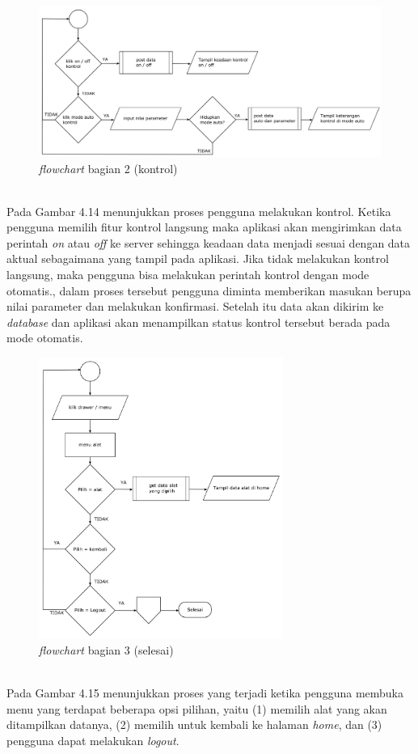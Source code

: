 \begin{flushleft}
\begin{justify}
\begin{enumerate}[label=\alph*.]
            \vspace{8cm}
            \begin{figure}[ht]
                \centering
                \includegraphics[width=12cm]{images/bab 4/fc-kontrol.png}
                \caption{\textit{flowchart} bagian 2 (kontrol)}
            \end{figure}
            \\Pada Gambar 4.14 menunjukkan proses pengguna melakukan kontrol. Ketika pengguna memilih fitur kontrol langsung maka aplikasi akan mengirimkan data perintah \emph{on} atau \emph{off}
            ke server sehingga keadaan data menjadi sesuai dengan data aktual sebagaimana yang tampil pada aplikasi. 
            Jika tidak melakukan kontrol langsung, maka pengguna bisa melakukan perintah kontrol dengan mode otomatis., dalam proses tersebut pengguna diminta memberikan masukan berupa nilai parameter dan melakukan konfirmasi. Setelah itu data akan dikirim ke \emph{database} dan aplikasi akan menampilkan status kontrol tersebut berada pada mode otomatis.
            \begin{figure}[ht]
                \centering
                \includegraphics[width=8cm]{images/bab 4/fc-pilih alat.png}
                \caption{\textit{flowchart} bagian 3 (selesai)}
            \end{figure}
            \\Pada Gambar 4.15 menunjukkan proses yang terjadi ketika pengguna membuka menu yang terdapat beberapa opsi pilihan, yaitu (1) memilih alat yang akan ditampilkan datanya, (2) memilih untuk kembali ke halaman \emph{home}, dan (3) pengguna dapat melakukan \emph{logout}.
           

\end{enumerate}
\end{justify}
\end{flushleft}
